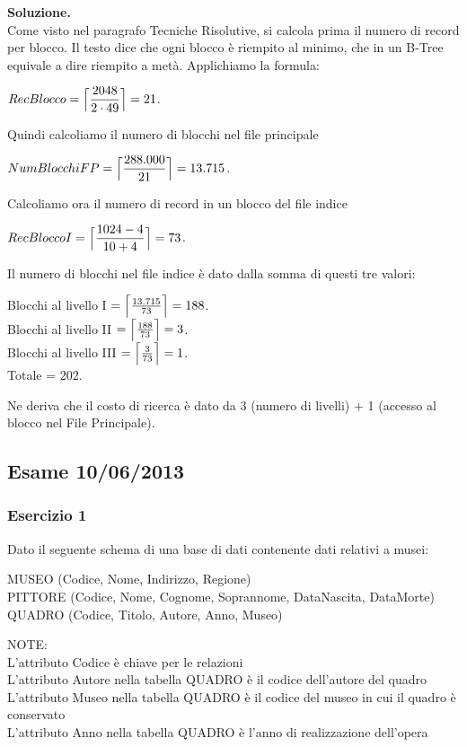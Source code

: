 \noindent\textbf{\fontsize{14pt}{1em}Soluzione.}\\
Come visto nel paragrafo Tecniche Risolutive, si calcola prima il numero di record per blocco. Il testo dice che 
ogni blocco è riempito al minimo, che in un B-Tree equivale a dire riempito a metà. Applichiamo la formula:
 \begin{center}
 $RecBlocco = \Bigl\lceil \dfrac{2048}{2\cdot 49} \Bigr\rceil = 21$.\\
\end{center}
Quindi calcoliamo il numero di blocchi nel file principale
\begin{center}
 $NumBlocchiFP = \Bigl\lceil \dfrac{288.000}{21} \Bigr\rceil = 13.715$.\\
\end{center}
Calcoliamo ora il numero di record in un blocco del file indice
\begin{center}
 $RecBloccoI = \Bigl\lceil \dfrac{1024-4}{10+4} \Bigr\rceil = 73$.\\
\end{center}
Il numero di blocchi nel file indice è dato dalla somma di questi tre valori:
\begin{center}
 Blocchi al livello I $= \Bigl\lceil \frac{13.715}{73} \Bigr\rceil = 188$.\\
 
 Blocchi al livello II $= \Bigl\lceil \frac{188}{73} \Bigr\rceil = 3$.\\
 
 Blocchi al livello III $= \Bigl\lceil \frac{3}{73} \Bigr\rceil = 1$.\\
 Totale = $202$.
\end{center}
Ne deriva che il costo di ricerca è dato da 3 (numero di livelli) + 1 (accesso al blocco nel File Principale).
\newpage
\subsection{Esame 10/06/2013}
  \subsubsection{Esercizio 1}
  Dato il seguente schema di una base di dati contenente dati relativi a musei:
  \begin{center}
  MUSEO (Codice, Nome, Indirizzo, Regione)\\
  PITTORE (Codice, Nome, Cognome, Soprannome, DataNascita, DataMorte)\\
  QUADRO (Codice, Titolo, Autore, Anno, Museo)\\
  \end{center}
  NOTE:\\
  L'attributo Codice è chiave per le relazioni\\
  L'attributo Autore nella tabella QUADRO è il codice dell'autore del quadro\\
  L'attributo Museo nella tabella QUADRO è il codice del museo in cui il quadro è conservato\\
  L'attributo Anno nella tabella QUADRO è l'anno di realizzazione dell'opera\\

